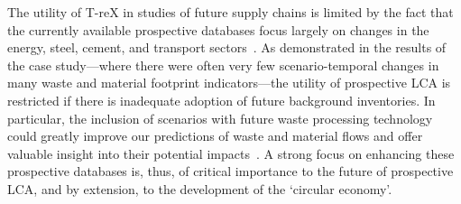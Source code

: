 The utility of T-reX in studies of future supply chains is limited by the fact that the currently available prospective databases focus largely on changes in the energy, steel, cement, and transport sectors~\citep{sacchi2023premisedocs}. As demonstrated in the results of the case study---where there were often very few scenario-temporal changes in many waste and material footprint indicators---the utility of prospective LCA is restricted if there is inadequate adoption of future background inventories. In particular, the inclusion of scenarios with future waste processing technology could greatly improve our predictions of waste and material flows and offer valuable insight into their potential impacts~\citep{bisinella2024wastelca}. A strong focus on enhancing these prospective databases is, thus, of critical importance to the future of prospective LCA, and by extension, to the development of the `circular economy'.